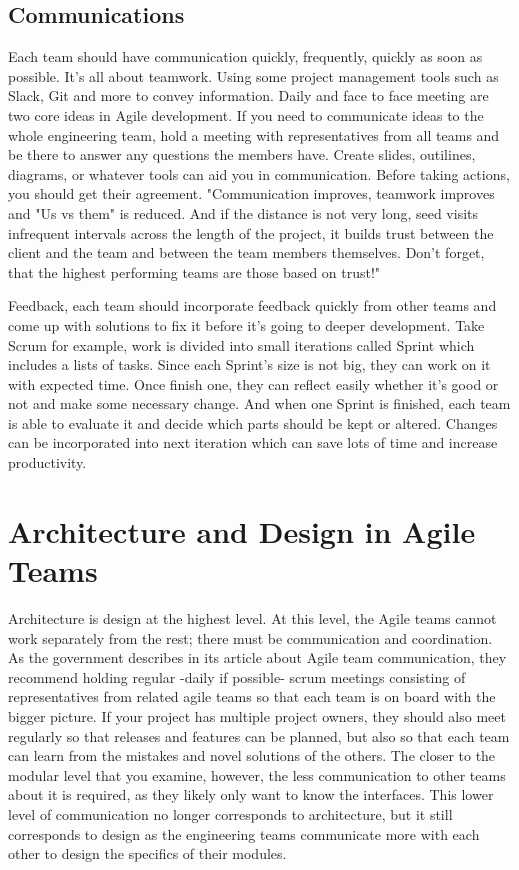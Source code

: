 \documentclass[sigplan,screen]{acmart}
\begin{document}
\subsection{Communications}
Each team should have communication quickly, frequently, quickly as soon as possible. It's all about teamwork. Using some project management tools such as Slack, Git and more to convey information. Daily and face to face meeting are two core ideas in Agile development. If you need to communicate ideas to the whole engineering team, hold a meeting with representatives from all teams and be there to answer any questions the members have. Create slides, outilines, diagrams, or whatever tools can aid you in communication. Before taking actions, you should get their agreement. "Communication improves, teamwork improves and "Us vs them" is reduced. And if the distance is not very long, seed visits infrequent intervals across the length of the project, it builds trust between the client and the team and between the team members themselves. Don't forget, that the highest performing teams are those based on trust!"\cite{David}

Feedback, each team should incorporate feedback quickly from other teams and come up with solutions to fix it before it's going to deeper development. Take Scrum for example, work is divided into small iterations called Sprint which includes a lists of tasks. Since each Sprint's size is not big, they can work on it with expected time. Once finish one, they can reflect easily whether it's good or not and make some necessary change. And when one Sprint is finished, each team is able to evaluate it and decide which parts should be kept or altered. Changes can be incorporated  into next iteration which can save lots of time and increase productivity.

\section{Architecture and Design in Agile Teams}
Architecture is design at the highest level. At this level, the Agile teams cannot work separately from the rest; there must be communication and coordination. As the government describes in its article about Agile team communication, they recommend holding regular -daily if possible- scrum meetings consisting of representatives from related agile teams so that each team is on board with the bigger picture. \cite{Lulit} If your project has multiple project owners, they should also meet regularly so that releases and features can be planned, but also so that each team can learn from the mistakes and novel solutions of the others. \cite{Lulit} The closer to the modular level that you examine, however, the less communication to other teams about it is required, as they likely only want to know the interfaces. This lower level of communication no longer corresponds to architecture, but it still corresponds to design as the engineering teams communicate more with each other to design the specifics of their modules.
\end{document}

